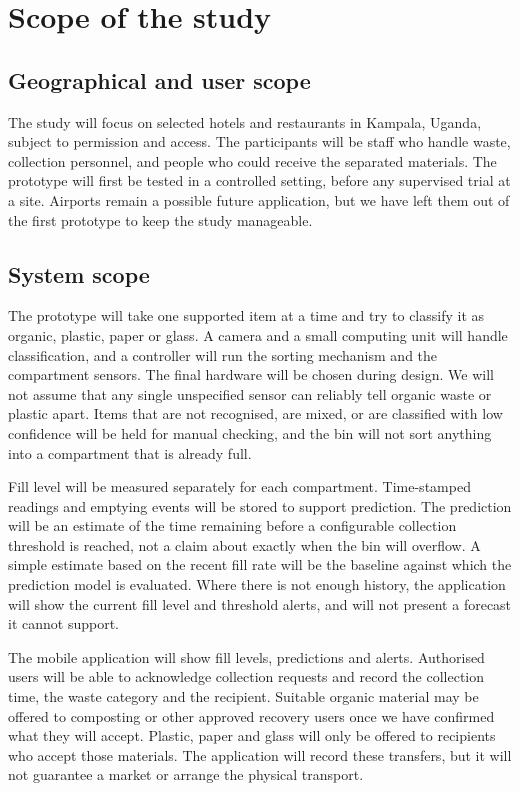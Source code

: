 \section{Scope of the study}

\subsection{Geographical and user scope}

The study will focus on selected hotels and restaurants in Kampala, Uganda, subject to permission and access. The participants will be staff who handle waste, collection personnel, and people who could receive the separated materials. The prototype will first be tested in a controlled setting, before any supervised trial at a site. Airports remain a possible future application, but we have left them out of the first prototype to keep the study manageable.

\subsection{System scope}

The prototype will take one supported item at a time and try to classify it as organic, plastic, paper or glass. A camera and a small computing unit will handle classification, and a controller will run the sorting mechanism and the compartment sensors. The final hardware will be chosen during design. We will not assume that any single unspecified sensor can reliably tell organic waste or plastic apart. Items that are not recognised, are mixed, or are classified with low confidence will be held for manual checking, and the bin will not sort anything into a compartment that is already full.

Fill level will be measured separately for each compartment. Time-stamped readings and emptying events will be stored to support prediction. The prediction will be an estimate of the time remaining before a configurable collection threshold is reached, not a claim about exactly when the bin will overflow. A simple estimate based on the recent fill rate will be the baseline against which the prediction model is evaluated. Where there is not enough history, the application will show the current fill level and threshold alerts, and will not present a forecast it cannot support.

The mobile application will show fill levels, predictions and alerts. Authorised users will be able to acknowledge collection requests and record the collection time, the waste category and the recipient. Suitable organic material may be offered to composting or other approved recovery users once we have confirmed what they will accept. Plastic, paper and glass will only be offered to recipients who accept those materials. The application will record these transfers, but it will not guarantee a market or arrange the physical transport.

